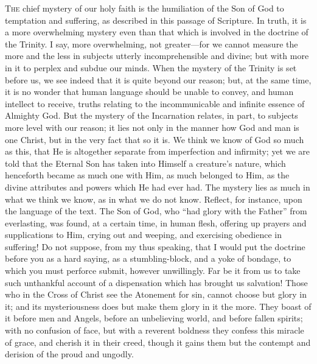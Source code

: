 T\textsc{he} chief mystery of our holy faith is the humiliation of the Son
of God to temptation and suffering, as described in this passage of
Scripture. In truth, it is a more overwhelming mystery even than that
which is involved in the doctrine of the Trinity. I say, more
overwhelming, not greater—for we cannot measure the more and the
less in subjects utterly incomprehensible and divine; but with more in
it to perplex and subdue our minds. When the mystery of the Trinity is
set before us, we see indeed that it is quite beyond our reason; but,
at the same time, it is no wonder that human language should be unable
to convey, and human intellect to receive, truths relating to the
incommunicable and infinite essence of Almighty God. But the mystery
of the Incarnation relates, in part, to subjects more level with our
reason; it lies not only in the manner how God and man is one Christ,
but in the very fact that so it is. We think we know of God so much as
this, that He is altogether separate from imperfection and infirmity;
yet we are told that the Eternal Son has taken into Himself a
creature's nature, which henceforth became as much one with Him, as
much belonged to Him, as the divine attributes and powers which He had
ever had. The mystery lies as much in what we think we know, as in
what we do not know. Reflect, for instance, upon the language of the
text. The Son of God, who ``had glory with the Father'' from
everlasting, was found, at a certain time, in human flesh, offering up
prayers and supplications to Him, crying out and weeping, and
exercising obedience in suffering! Do not suppose, from my thus
speaking, that I would put the doctrine before you as a hard saying,
as a stumbling-block, and a yoke of bondage, to which you must
perforce submit, however unwillingly. Far be it from us to take such
unthankful account of a dispensation which has brought us salvation!
Those who in the Cross of Christ see the Atonement for sin, cannot
choose but glory in it; and its mysteriousness does but make them
glory in it the more. They boast of it before men and Angels, before
an unbelieving world, and before fallen spirits; with no confusion of
face, but with a reverent boldness they confess this miracle of grace,
and cherish it in their creed, though it gains them but the contempt
and derision of the proud and ungodly.

